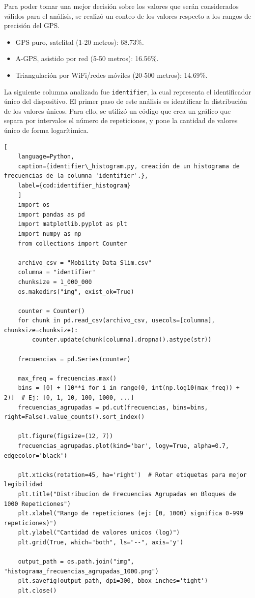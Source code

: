 \noindent Para poder tomar una mejor decisión sobre los valores que serán considerados válidos para el análisis, se realizó un conteo de los valores respecto a los rangos de precisión del GPS. 

\begin{itemize}
    \item GPS puro, satelital (1-20 metros): 68.73\%.
    \item A-GPS, asistido por red (5-50 metros): 16.56\%.
    \item Triangulación por WiFi/redes móviles (20-500 metros): 14.69\%.
\end{itemize}

\newpage

\noindent La siguiente columna analizada fue \texttt{identifier}, la cual representa el identificador único del dispositivo. El primer paso de este análisis es identificar la distribución de los valores únicos. Para ello, se utilizó un código que crea un gráfico que separa por intervalos el número de repeticiones, y pone la cantidad de valores único de forma logarítimica. 

\begin{lstlisting}[
    language=Python,
    caption={identifier\_histogram.py, creación de un histograma de frecuencias de la columna 'identifier'.},
    label={cod:identifier_histogram}
    ]
    import os
    import pandas as pd
    import matplotlib.pyplot as plt
    import numpy as np
    from collections import Counter

    archivo_csv = "Mobility_Data_Slim.csv"
    columna = "identifier"  
    chunksize = 1_000_000  
    os.makedirs("img", exist_ok=True) 

    counter = Counter()
    for chunk in pd.read_csv(archivo_csv, usecols=[columna], chunksize=chunksize):
        counter.update(chunk[columna].dropna().astype(str))

    frecuencias = pd.Series(counter)

    max_freq = frecuencias.max()
    bins = [0] + [10**i for i in range(0, int(np.log10(max_freq)) + 2)]  # Ej: [0, 1, 10, 100, 1000, ...]
    frecuencias_agrupadas = pd.cut(frecuencias, bins=bins, right=False).value_counts().sort_index()

    plt.figure(figsize=(12, 7))
    frecuencias_agrupadas.plot(kind='bar', logy=True, alpha=0.7, edgecolor='black')

    plt.xticks(rotation=45, ha='right')  # Rotar etiquetas para mejor legibilidad
    plt.title("Distribucion de Frecuencias Agrupadas en Bloques de 1000 Repeticiones")
    plt.xlabel("Rango de repeticiones (ej: [0, 1000) significa 0-999 repeticiones)")
    plt.ylabel("Cantidad de valores unicos (log)")
    plt.grid(True, which="both", ls="--", axis='y')

    output_path = os.path.join("img", "histograma_frecuencias_agrupadas_1000.png")
    plt.savefig(output_path, dpi=300, bbox_inches='tight')
    plt.close()
\end{lstlisting}

